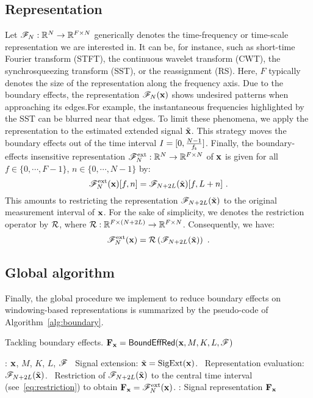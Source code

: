 \subsection{Representation}
 
Let ${\mathscr F}_{N}:{\mathbb R}^{N}\to{\mathbb R}^{F\times N}$ generically denotes the time-frequency or time-scale representation we are interested in. It can be, for instance, such as short-time Fourier transform (STFT), the continuous wavelet transform (CWT), the synchrosqueezing transform (SST), or the reassignment (RS). Here, $F$ typically denotes the size of the representation along the frequency axis. Due to the boundary effects, the representation ${\mathscr F}_{N}({\mathbf x})$ shows undesired patterns when approaching its edges.For example, the instantaneous frequencies highlighted by the SST can be blurred near that edges. To limit these phenomena, we apply the representation to the estimated extended signal $\tilde{{\mathbf x}}$. This strategy moves the boundary effects out of the time interval $I=[0, \frac{N-1}{f_{\mathsf s}}]$. Finally, the boundary-effects insensitive representation ${\mathscr F}_N^{\mathrm{ext}}:{\mathbb R}^{N}\to{\mathbb R}^{F\times N}$ of ${\mathbf x}$ is given for all $f\in\{0,\cdots,F-1\}$, $n\in\{0,\cdots,N-1\}$ by:
\begin{equation}
{\mathscr F}_N^{\mathrm{ext}}({\mathbf x})[f,n] = {\mathscr F}_{N+2L}(\tilde {{\mathbf x}})[f,L+n]\ .
\label{eq:restriction}
\end{equation}
This amounts to restricting the representation ${\mathscr F}_{N+2L}(\tilde {{\mathbf x}})$ to the original measurement interval of ${\mathbf x}$. For the sake of simplicity, we denotes the restriction operator by ${\mathcal R}$, where ${\mathcal R}:{\mathbb R}^{F\times (N+2L)}\to{\mathbb R}^{F\times N}$. Consequently, we have:
\begin{equation*}
{\mathscr F}_N^{\mathrm{ext}}({\mathbf x}) = {\mathcal R}\left( {\mathscr F}_{N+2L}(\tilde {{\mathbf x}}) \right) \ .
\end{equation*}

\subsection{Global algorithm}
Finally, the global procedure we implement to reduce boundary effects on windowing-based representations is summarized by the pseudo-code of Algorithm~\ref{alg:boundary}.

\begin{algorithm}
\caption{Tackling boundary effects. ${\mathbf F}_{\mathbf x} = \mathsf{BoundEffRed(}{\mathbf x},M,K,L,{\mathscr F})$}
\label{alg:boundary}
\begin{algorithmic}
: ${\mathbf x}$, $M$, $K$, $L$, ${\mathscr F}$
\STATE 
{}
\STATE \quad\textbullet\ Signal extension: $\tilde{{\mathbf x}} = \mathrm{SigExt}({\mathbf x})$.
\STATE 
{}
\STATE \quad\textbullet\ Representation evaluation: ${\mathscr F}_{N+2L}(\tilde{{\mathbf x}})$.
\STATE \quad\textbullet\ Restriction of ${\mathscr F}_{N+2L}(\tilde{{\mathbf x}})$ to the central time interval (see~\eqref{eq:restriction}) to obtain ${\mathbf F}_{\mathbf x}={\mathscr F}_N^{\mathrm{ext}}({\mathbf x})$.
\STATE 
{}: Signal representation ${\mathbf F}_{\mathbf x}$
\end{algorithmic}
\end{algorithm}